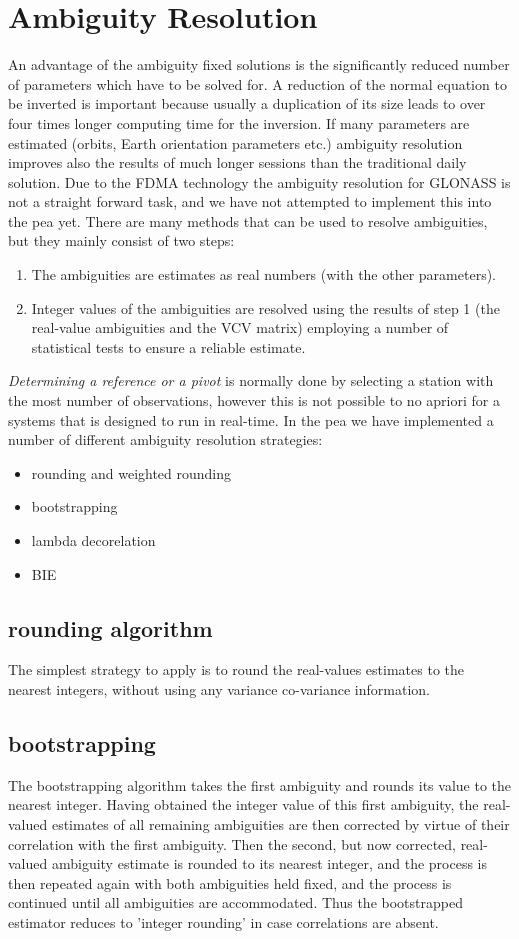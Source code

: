 \chapter{Ambiguity Resolution}
\label{ch:Ambiguity Resolution}
An advantage of the ambiguity fixed solutions is the significantly reduced number of parameters which have to be solved for. 
A reduction of the normal equation to be inverted is important because usually a duplication of its size leads to over four times longer computing time for the inversion. 
If many parameters are estimated (orbits, Earth orientation parameters etc.) ambiguity resolution improves also the results of much longer sessions than the traditional daily solution.  
Due to the FDMA technology the ambiguity resolution for GLONASS is not a straight forward task, and we have not attempted to implement this into the pea yet.
%
There are many methods that can be used to resolve ambiguities, but they mainly consist of two steps:
%
\begin{enumerate}
    \item The ambiguities are estimates as real numbers (with the other parameters).
    \item Integer values of the ambiguities are resolved using the results of step 1 (the real-value ambiguities and the VCV matrix) employing a number of statistical tests to ensure a reliable estimate.
\end{enumerate}
%
\textit{Determining a reference or a pivot} is normally done by selecting a station with the most number of observations, however this is not possible to no apriori for a systems that is designed to run in real-time.
%
In the pea we have implemented a number of different ambiguity resolution strategies:
\begin{itemize}
    \item rounding and weighted rounding
    \item bootstrapping
    \item lambda decorelation
    \item BIE
\end{itemize}
%
\section{rounding algorithm}
The simplest strategy to apply is to round the real-values estimates to the nearest integers, without using any variance co-variance information.
%
\section{bootstrapping}
%
The bootstrapping algorithm takes the first ambiguity and rounds its value to the nearest integer. Having obtained the integer value of this first ambiguity, the real-valued estimates of all remaining ambiguities are then corrected by virtue of their correlation with the first ambiguity. 
Then the second, but now corrected, real-valued ambiguity estimate is rounded to its nearest integer, and the process is then repeated again with both ambiguities held fixed, and the process is continued until all ambiguities are accommodated. 
Thus the bootstrapped estimator reduces to ’integer rounding’ in case correlations are absent.
%
